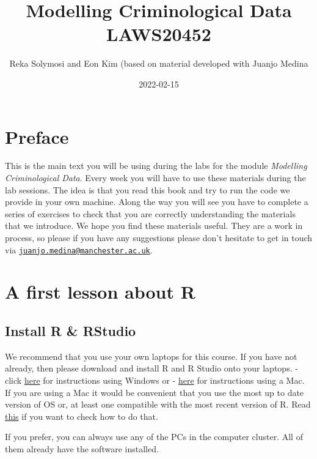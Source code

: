 \documentclass[
]{book}
\title{Modelling Criminological Data LAWS20452}
\author{Reka Solymosi and Eon Kim (based on material developed with Juanjo Medina}
\date{2022-02-15}
\begin{document}
\maketitle

{
\setcounter{tocdepth}{1}
\tableofcontents
}
\hypertarget{preface}{%
\chapter*{Preface}\label{preface}}

This is the main text you will be using during the labs for the module \emph{Modelling Criminological Data}. Every week you will have to use these materials during the lab sessions. The idea is that you read this book and try to run the code we provide in your own machine. Along the way you will see you have to complete a series of exercises to check that you are correctly understanding the materials that we introduce. We hope you find these materials useful. They are a work in process, so please if you have any suggestions please don't hesitate to get in touch via \href{mailto:juanjo.medina@manchester.ac.uk}{\nolinkurl{juanjo.medina@manchester.ac.uk}}.

\hypertarget{a-first-lesson-about-r}{%
\chapter{A first lesson about R}\label{a-first-lesson-about-r}}

\hypertarget{install-r-rstudio}{%
\section{Install R \& RStudio}\label{install-r-rstudio}}

We recommend that you use your own laptops for this course. If you have not already, then please download and install R and R Studio onto your laptops.
- click \href{https://www.youtube.com/watch?v=eD07NznguA4}{here} for instructions using Windows or
- \href{https://www.youtube.com/watch?v=cX532N_XLIs\&list=PLqzoL9-eJTNDw71zWePXyHx3_cm_fMP8S}{here} for instructions using a Mac. If you are using a Mac it would be convenient that you use the most up to date version of OS or, at least one compatible with the most recent version of R. Read \href{}{this} if you want to check how to do that.

If you prefer, you can always use any of the PCs in the computer cluster. All of them already have the software installed.
\end{document}

